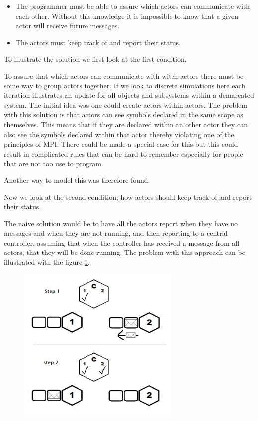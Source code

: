 \begin{itemize}
\item The programmer must be able to assure which actors can communicate with each other. Without this knowledge it is impossible to know that a given actor will receive future messages.
\item The actors must keep track of and report their status.
\end{itemize} 

To illustrate the solution we first look at the first condition.

To assure that which actors can communicate with witch actors there must be some way to group actors together. If we look to discrete simulations here each iteration illustrates an update for all objects and subsystems within a demarcated system. The initial idea was one could create actors within actors. The problem with this solution is that actors can see symbols declared in the same scope as themselves. This means that if they are declared within an other actor they can also see the symbols declared within that actor thereby violating one of the principles of MPI. There could be made a special case for this but this could result in complicated rules that can be hard to remember especially for people that are not too use to program.

Another way to model this was therefore found. 

Now we look at the second condition; how actors should keep track of and report their status.

The naive solution would be to have all the actors report when they have no messages and when they are not running, and then reporting to a central controller, assuming that when the controller has received a message from all actors, that they will be done running. The problem with this approach can be illustrated with the figure \cref{iterationproblem_img}. 

\begin{figure}[htbp]
\centering
\includegraphics[width=0.7\textwidth]{Analysis/Supercomputing/iterationproblem.png}\label{iterationproblem_img}
\end{figure}


